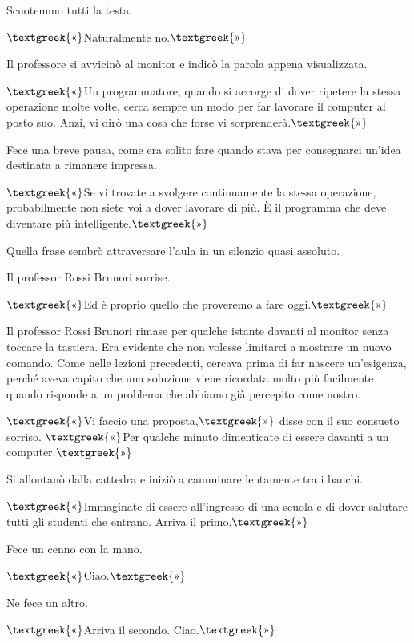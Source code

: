 \documentclass{article}
\begin{document}
Scuotemmo tutti la testa.

$\text{\textgreek{«}}$Naturalmente no.$\text{\textgreek{»}}$

Il professore si avvicinò al monitor e indicò la parola appena visualizzata.

$\text{\textgreek{«}}$Un programmatore, quando si accorge di dover ripetere la stessa operazione molte volte, cerca
sempre un modo per far lavorare il computer al posto suo. Anzi, vi dirò una cosa che forse vi
sorprenderà.$\text{\textgreek{»}}$

Fece una breve pausa, come era solito fare quando stava per consegnarci un'idea destinata a rimanere impressa.

$\text{\textgreek{«}}$Se vi trovate a svolgere continuamente la stessa operazione, probabilmente non siete voi a dover
lavorare di più. È il programma che deve diventare più intelligente.$\text{\textgreek{»}}$

Quella frase sembrò attraversare l'aula in un silenzio quasi assoluto.

Il professor Rossi Brunori sorrise.

$\text{\textgreek{«}}$Ed è proprio quello che proveremo a fare oggi.$\text{\textgreek{»}}$

Il professor Rossi Brunori rimase per qualche istante davanti al monitor senza toccare la tastiera. Era evidente che non
volesse limitarci a mostrare un nuovo comando. Come nelle lezioni precedenti, cercava prima di far nascere un'esigenza,
perché aveva capito che una soluzione viene ricordata molto più facilmente quando risponde a un problema che abbiamo
già percepito come nostro.

$\text{\textgreek{«}}$Vi faccio una proposta,$\text{\textgreek{»}}$ disse con il suo consueto sorriso.
$\text{\textgreek{«}}$Per qualche minuto dimenticate di essere davanti a un computer.$\text{\textgreek{»}}$

Si allontanò dalla cattedra e iniziò a camminare lentamente tra i banchi.

$\text{\textgreek{«}}$Immaginate di essere all'ingresso di una scuola e di dover salutare tutti gli studenti che
entrano. Arriva il primo.$\text{\textgreek{»}}$

Fece un cenno con la mano.

$\text{\textgreek{«}}$Ciao.$\text{\textgreek{»}}$

Ne fece un altro.

$\text{\textgreek{«}}$Arriva il secondo. Ciao.$\text{\textgreek{»}}$
\end{document}
